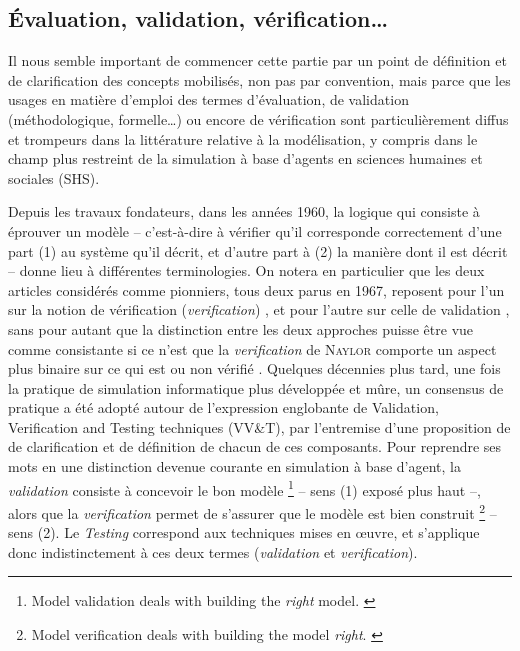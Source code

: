 \subsection{Évaluation, validation, vérification\ldots}

Il nous semble important de commencer cette partie par un point de définition et de clarification des concepts mobilisés, non pas par convention, mais parce que les usages en matière d'emploi des termes d'évaluation, de validation (méthodologique, formelle\ldots) ou encore de vérification sont particulièrement diffus et trompeurs dans la littérature relative à la modélisation, y compris dans le champ plus restreint de la simulation à base d'agents en sciences humaines et sociales (SHS).

Depuis les travaux fondateurs, dans les années 1960, la logique qui consiste à éprouver un modèle -- c'est-à-dire à vérifier qu'il corresponde correctement d'une part (1) au système qu'il décrit, et d'autre part à
(2) la manière dont il est décrit -- donne lieu à différentes terminologies.
On notera en particulier que les deux articles considérés comme pionniers, tous deux parus en 1967, reposent pour l'un sur la notion de vérification (\textit{verification}) \autocite{naylor_verification_1967}, et pour l'autre sur celle de validation \autocite{hermann_validation_1967}, sans pour autant que la distinction entre les deux approches puisse être vue comme consistante si ce n'est que la \textit{verification} de \textsc{Naylor} comporte un aspect plus \og binaire\fg{} sur ce qui est ou non vérifié \autocite[137]{rey-coyrehourcq_plateforme_2015}.
Quelques décennies plus tard, une fois la pratique de simulation informatique plus développée et mûre, un consensus de pratique a été adopté autour de l'expression englobante de \og Validation, Verification and Testing techniques (VV\&T)\fg{}, par l'entremise d'une proposition de \textcite{balci_validation_1994} de clarification et de définition de chacun de ces composants.
Pour reprendre ses mots en une distinction devenue courante en simulation à base d'agent, la \textit{validation} consiste à concevoir le bon modèle 
\footnote{
	\og Model validation deals with building the \textit{right} model.\fg{} \autocite[121]{balci_validation_1994}
} -- sens (1) exposé plus haut --,
alors que la \textit{verification} permet de s'assurer que le modèle est bien construit
\footnote{
	\og Model verification deals with building the model \textit{right}.\fg{} \autocite[123]{balci_validation_1994}
} -- sens (2).
Le \og \textit{Testing}\fg{} correspond aux techniques mises en œuvre, et s'applique donc indistinctement à ces deux termes (\textit{validation} et \textit{verification}).

